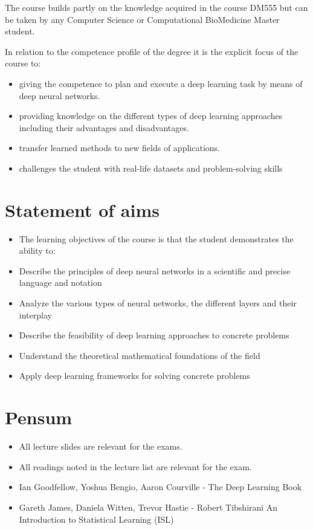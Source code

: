 \documentclass[a4paper,10pt,titlepage]{report}
\begin{document}
The course builds partly on the knowledge acquired in the course DM555 but can be taken by any Computer Science or Computational BioMedicine Master student.\\
\vspace{10mm}

In relation to the competence profile of the degree it is the explicit focus of the course to:
\begin{itemize}
\item giving the competence to plan and execute a deep learning task by means of deep neural networks.
\item providing knowledge on the different types of deep learning approaches including their advantages and disadvantages.
\item transfer learned methods to new fields of applications.
\item challenges the student with real-life datasets and problem-solving skills
\end{itemize}

\section{Statement of aims}
\begin{itemize}
\item The learning objectives of the course is that the student demonstrates the ability to:
\item Describe the principles of deep neural networks in a scientific and precise language and notation
\item Analyze the various types of neural networks, the different layers and their interplay 
\item Describe the feasibility of deep learning approaches to concrete problems
\item Understand the theoretical mathematical foundations of the field 
\item Apply deep learning frameworks for solving concrete problems
\end{itemize}


\section{Pensum}

\begin{itemize}
\item All lecture slides are relevant for the exams.
\item All readings noted in the lecture list are relevant for the exam.
\item Ian Goodfellow, Yoshua Bengio, Aaron Courville - The Deep Learning Book
\item Gareth James, Daniela Witten, Trevor Hastie - Robert Tibshirani An Introduction to Statistical Learning (ISL)

\end{itemize}
\end{document}
